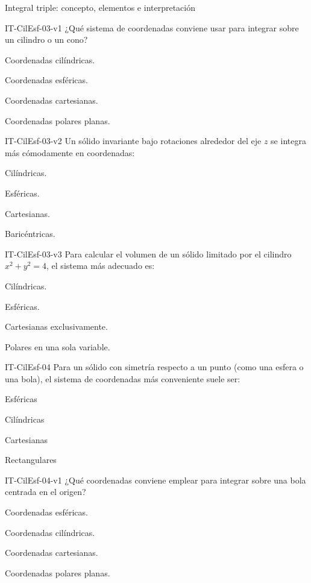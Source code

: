\documentclass[a4,11pt]{aleph-notas}
\begin{document}
\begin{quiz}{Integral triple: concepto, elementos e interpretación}
\begin{multi}[]%
    {IT-CilEsf-03-v1}
    ¿Qué sistema de coordenadas conviene usar para integrar sobre un cilindro o un cono?
    \item* Coordenadas cilíndricas.
    \item Coordenadas esféricas.
    \item Coordenadas cartesianas.
    \item Coordenadas polares planas.
\end{multi}

\begin{multi}[]%
    {IT-CilEsf-03-v2}
    Un sólido invariante bajo rotaciones alrededor del eje $z$ se integra más cómodamente en coordenadas:
    \item* Cilíndricas.
    \item Esféricas.
    \item Cartesianas.
    \item Baricéntricas.
\end{multi}

\begin{multi}[]%
    {IT-CilEsf-03-v3}
    Para calcular el volumen de un sólido limitado por el cilindro $x^2+y^2=4$, el sistema más adecuado es:
    \item* Cilíndricas.
    \item Esféricas.
    \item Cartesianas exclusivamente.
    \item Polares en una sola variable.
\end{multi}

\begin{multi}[]%
    {IT-CilEsf-04}
    Para un sólido con simetría respecto a un punto (como una esfera o una bola), el sistema de coordenadas más conveniente suele ser:
    \item* Esféricas
    \item Cilíndricas
    \item Cartesianas
    \item Rectangulares
\end{multi}

\begin{multi}[]%
    {IT-CilEsf-04-v1}
    ¿Qué coordenadas conviene emplear para integrar sobre una bola centrada en el origen?
    \item* Coordenadas esféricas.
    \item Coordenadas cilíndricas.
    \item Coordenadas cartesianas.
    \item Coordenadas polares planas.
\end{multi}


\end{quiz}
\end{document}
